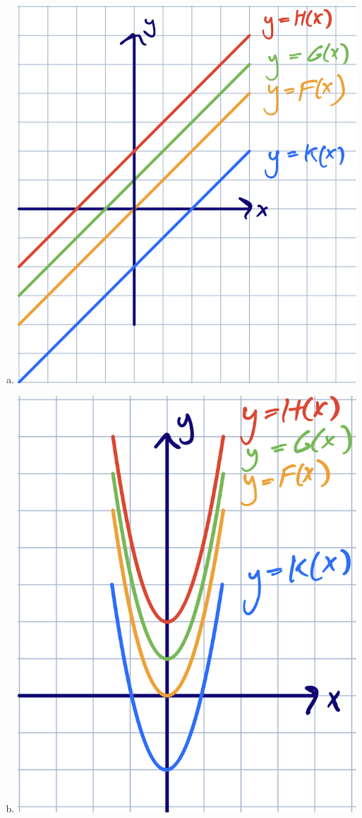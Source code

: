 \documentclass[11pt]{exam}
\begin{document}
\begin{questions}
\begin{solution}
\begin{multicols}{2}
\begin{enumerate}[(a)]
    \item \includegraphics[scale=0.4]{1b}
    \item \includegraphics[scale=0.4]{1c}

\end{enumerate}
\end{multicols}
\end{solution}
\end{questions}
\end{document}
